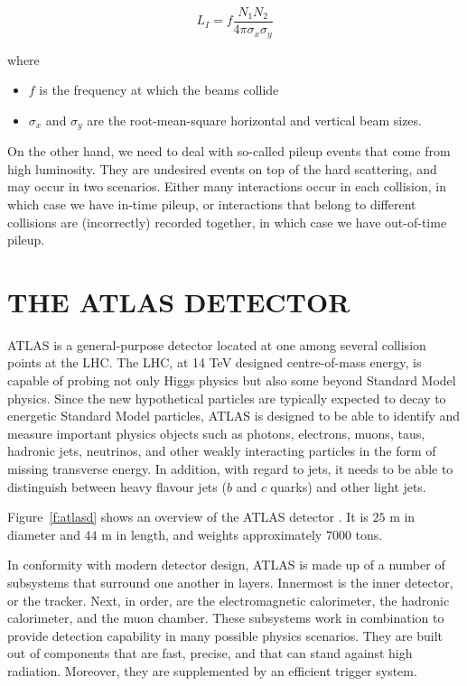 $$L_I = f \frac{N_1N_2}{4\pi \sigma_x\sigma_y} $$

where

\begin{itemize}
	\item $f$ is the frequency at which the beams collide

	\item $\sigma_x$ and $\sigma_y$ are the root-mean-square horizontal and
	      vertical beam sizes.

\end{itemize}

On the other hand, we need to deal with so-called pileup events that come from
high luminosity. They are undesired events on top of the hard scattering, and
may occur in two scenarios. Either many interactions occur in each collision,
in which case we have in-time pileup, or interactions that belong to different
collisions are (incorrectly) recorded together, in which case we have
out-of-time pileup.

\section{THE ATLAS DETECTOR}

ATLAS \cite{lhcaccexp} is a general-purpose detector located at one among
several collision points at the LHC. The LHC, at 14 TeV designed centre-of-mass
energy, is capable of probing not only Higgs physics but also some beyond
Standard Model physics. Since the new hypothetical particles are typically
expected to decay to energetic Standard Model particles, ATLAS is designed to
be able to identify and measure important physics objects such as photons,
electrons, muons, taus, hadronic jets, neutrinos, and other weakly interacting
particles in the form of missing transverse energy. In addition, with regard to
jets, it needs to be able to distinguish between heavy flavour jets ($b$ and
$c$ quarks) and other light jets.

Figure~\ref{f:atlasd} shows an overview of the ATLAS detector . It is $25$ m in
diameter and $44$ m in length, and weights approximately $7000$ tons.

In conformity with modern detector design, ATLAS is made up of a number of
subsystems that surround one another in layers. Innermost is the inner
detector, or the tracker. Next, in order, are the electromagnetic calorimeter,
the hadronic calorimeter, and the muon chamber. These subsystems work in
combination to provide detection capability in many possible physics scenarios.
They are built out of components that are fast, precise, and that can stand
against high radiation. Moreover, they are supplemented by an efficient trigger
system.

